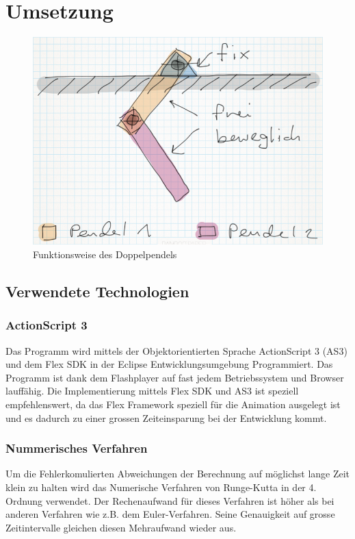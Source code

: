 \documentclass[12pt]{article}
\numberwithin{equation}{subsection}
\begin{document}
\newpage
\section{Umsetzung}

\begin{figure}[h]
	\centering
	\includegraphics[width=\textwidth]{function.png}
	\caption{Funktionsweise des Doppelpendels}
	\label{fig:function}
\end{figure}

\subsection{Verwendete Technologien}

\subsubsection{ActionScript 3}
Das Programm wird mittels der Objektorientierten Sprache ActionScript 3 (AS3) und dem Flex SDK in der Eclipse Entwicklungsumgebung Programmiert. Das Programm ist dank dem Flashplayer auf fast jedem Betriebssystem und Browser lauffähig.
Die Implementierung mittels Flex SDK und AS3 ist speziell empfehlenswert, da das Flex Framework speziell für die Animation ausgelegt ist und es dadurch zu einer grossen Zeiteinsparung bei der Entwicklung kommt.

\subsubsection{Nummerisches Verfahren}
Um die Fehlerkomulierten Abweichungen der Berechnung auf möglichst lange Zeit klein zu halten wird das Numerische Verfahren von Runge-Kutta in der 4. Ordnung verwendet. Der Rechenaufwand für dieses Verfahren ist höher als bei anderen Verfahren wie z.B. dem Euler-Verfahren. Seine Genauigkeit auf grosse Zeitintervalle gleichen diesen Mehraufwand wieder aus.
\end{document}
